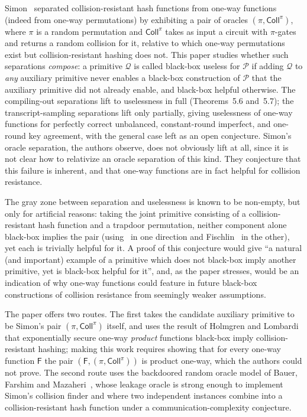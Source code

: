 \documentclass{aicr-conjecture}
\newcommand{\Pc}{\mathcal{P}}
\newcommand{\Qc}{\mathcal{Q}}
\newcommand{\Fs}{\mathsf{F}}
\newcommand{\Coll}{\mathsf{Coll}}
\newcommand{\simonpair}{(\pi,\Coll^{\pi})}
\begin{document}
Simon~\cite{Sim98} separated collision-resistant hash functions from
one-way functions (indeed from one-way permutations) by exhibiting a pair
of oracles $\simonpair$, where $\pi$ is a random permutation and
$\Coll^{\pi}$ takes as input a circuit with $\pi$-gates and returns a
random collision for it, relative to which one-way permutations exist but
collision-resistant hashing does not. This paper studies whether such
separations \emph{compose}: a primitive $\Qc$ is called black-box useless
for $\Pc$ if adding $\Qc$ to \emph{any} auxiliary primitive never enables
a black-box construction of $\Pc$ that the auxiliary primitive did not
already enable, and black-box helpful otherwise. The compiling-out
separations lift to uselessness in full (Theorems~5.6 and~5.7); the
transcript-sampling separations lift only partially, giving uselessness of
one-way functions for perfectly correct unbalanced, constant-round
imperfect, and one-round key agreement, with the general case left as an
open conjecture. Simon's oracle separation, the authors observe, does not
obviously lift at all, since it is not clear how to relativize an oracle
separation of this kind. They conjecture that this failure is inherent,
and that one-way functions are in fact helpful for collision resistance.

The gray zone between separation and uselessness is known to be
non-empty, but only for artificial reasons: taking the joint primitive
consisting of a collision-resistant hash function and a trapdoor
permutation, neither component alone black-box implies the pair
(using~\cite{IR89} in one direction and Fischlin~\cite{Fis02} in the
other), yet each is trivially helpful for it. A proof of this conjecture
would give ``a natural (and important) example of a primitive which does
not black-box imply another primitive, yet is black-box helpful for it'',
and, as the paper stresses, would be an indication of why one-way
functions could feature in future black-box constructions of collision
resistance from seemingly weaker assumptions.

The paper offers two routes. The first takes the candidate auxiliary
primitive to be Simon's pair $\simonpair$ itself, and uses the result of
Holmgren and Lombardi~\cite{HL18} that exponentially secure one-way
\emph{product} functions black-box imply collision-resistant hashing;
making this work requires showing that for every one-way function $\Fs$
the pair $(\Fs,\simonpair)$ is product one-way, which the authors could
not prove. The second route uses the backdoored random oracle model of
Bauer, Farshim and Mazaheri~\cite{BFM18}, whose leakage oracle is strong
enough to implement Simon's collision finder and where two independent
instances combine into a collision-resistant hash function under a
communication-complexity conjecture.
\end{document}
